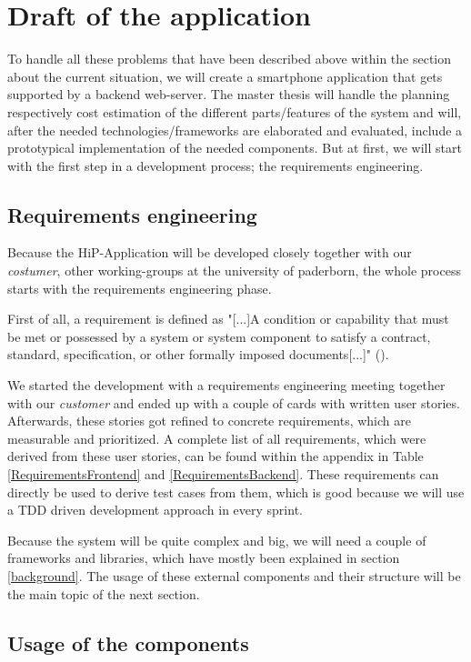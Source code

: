 \chapter[Draft of the application]{Draft of the application}
To handle all these problems that have been described above within the section about the current situation, we will create a smartphone application that gets supported by a backend web-server. The master thesis will handle the planning respectively cost estimation of the different parts/features of the system and will, after the needed technologies/frameworks are elaborated and evaluated, include a prototypical implementation of the needed components.
But at first, we will start with the first step in a development process; the requirements engineering.

\section{Requirements engineering}
Because the HiP-Application will be developed closely together with our \textit{costumer}, other working-groups at the university of paderborn, the whole process starts with the requirements engineering phase.

First of all, a requirement is defined as "[...]A condition or capability that must be met or possessed by a system or system component to satisfy a contract, standard, specification, or other formally imposed documents[...]" (\cite{IEEEReq}).

We started the development with a requirements engineering meeting together with our \textit{customer} and ended up with a couple of cards with written user stories. Afterwards, these stories got refined to concrete requirements, which are measurable and prioritized. A complete list of all requirements, which were derived from these user stories, can be found within the appendix in Table \ref{RequirementsFrontend} and \ref{RequirementsBackend}. These requirements can directly be used to derive test cases from them, which is good because we will use a \ac{TDD} driven development approach in every sprint. 

Because the system will be quite complex and big, we will need a couple of frameworks and libraries, which have mostly been explained in section \ref{background}. 
The usage of these external components and their structure will be the main topic of the next section.
  
\section{Usage of the components}

